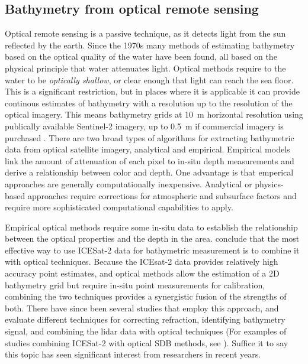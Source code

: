 \subsection{Bathymetry from optical remote sensing}
Optical remote sensing is a passive technique, as it detects light from the sun reflected by the earth. Since the 1970s many methods of estimating bathymetry based on the optical quality of the water have been found, all based on the physical principle that water attenuates light. Optical methods require to the water to be \emph{optically shallow}, or clear enough that light can reach the sea floor. This is a significant restriction, but in places where it is applicable it can provide continous estimates of bathymetry with a resolution up to the resolution of the optical imagery. This means bathymetry grids at 10~m horizontal resolution using publically available Sentinel-2 imagery, up to 0.5~m if commercial imagery is purchased \parencite{Babbel2021a,LeQuilleuc2022b,Pike2019}. There are two broad types of algorithms for extracting bathymetric data from optical satellite imagery, analytical and empirical. Empirical models link the amount of attenuation of each pixel to in-situ depth measurements and derive a relationship between color and depth. One advantage is that emperical approaches are generally computationally inexpensive. Analytical or physics-based approaches require corrections for atmospheric and subsurface factors \parencite{Turner2021} and require more sophisticated computational capabilities to apply.

Empirical optical methods require some in-situ data to establish the relationship between the optical properties and the depth in the area. \cite{Parrish2019} conclude that the most effective way to use ICESat-2 data for bathymetric measurement is to combine it with optical techniques. Because the ICEsat-2 data provides relatively high accuracy point estimates, and optical methods allow the estimation of a 2D bathymetry grid but require in-situ point measurements for calibration, combining the two techniques provides a synergistic fusion of the strengths of both. There have since been several studies that employ this approach, and evaluate different techniques for correcting refraction, identifying bathymetry signal, and combining the lidar data with optical techniques (For examples of studies combining ICESat-2 with optical SDB methods, see \cite{Geyman2019,Pike2019,Ma2020,Lee2021,Albright2021,Ranndal2021,Gleason2021,Thomas2021d,Babbel2021a,Hsu2021,Cao2021,Xie2021,Surisetty2022,Zhong2022a,Zheng2022,Daly2022,Xu2022,Magruder2020,Thomas2022,LeQuilleuc2022b}). Suffice it to say this topic has seen significant interest from researchers in recent years.

